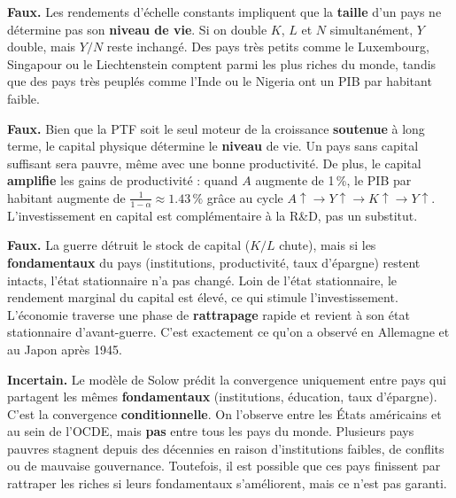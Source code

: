 \begin{reponse}
\textbf{Faux.} Les rendements d'échelle constants impliquent que la \textbf{taille} d'un pays ne détermine pas son \textbf{niveau de vie}. Si on double $K$, $L$ et $N$ simultanément, $Y$ double, mais $Y/N$ reste inchangé. Des pays très petits comme le Luxembourg, Singapour ou le Liechtenstein comptent parmi les plus riches du monde, tandis que des pays très peuplés comme l'Inde ou le Nigeria ont un PIB par habitant faible.
\end{reponse}


\begin{reponse}
\textbf{Faux.} Bien que la PTF soit le seul moteur de la croissance \textbf{soutenue} à long terme, le capital physique détermine le \textbf{niveau} de vie. Un pays sans capital suffisant sera pauvre, même avec une bonne productivité. De plus, le capital \textbf{amplifie} les gains de productivité : quand $A$ augmente de 1\,\%, le PIB par habitant augmente de $\frac{1}{1-\alpha} \approx 1.43\,\%$ grâce au cycle $A \uparrow \to Y \uparrow \to K \uparrow \to Y \uparrow$. L'investissement en capital est complémentaire à la R\&D, pas un substitut.
\end{reponse}


\begin{reponse}
\textbf{Faux.} La guerre détruit le stock de capital ($K/L$ chute), mais si les \textbf{fondamentaux} du pays (institutions, productivité, taux d'épargne) restent intacts, l'état stationnaire n'a pas changé. Loin de l'état stationnaire, le rendement marginal du capital est élevé, ce qui stimule l'investissement. L'économie traverse une phase de \textbf{rattrapage} rapide et revient à son état stationnaire d'avant-guerre. C'est exactement ce qu'on a observé en Allemagne et au Japon après 1945.
\end{reponse}


\begin{reponse}
\textbf{Incertain.} Le modèle de Solow prédit la convergence uniquement entre pays qui partagent les mêmes \textbf{fondamentaux} (institutions, éducation, taux d'épargne). C'est la convergence \textbf{conditionnelle}. On l'observe entre les États américains et au sein de l'OCDE, mais \textbf{pas} entre tous les pays du monde. Plusieurs pays pauvres stagnent depuis des décennies en raison d'institutions faibles, de conflits ou de mauvaise gouvernance. Toutefois, il est possible que ces pays finissent par rattraper les riches si leurs fondamentaux s'améliorent, mais ce n'est pas garanti.
\end{reponse}

